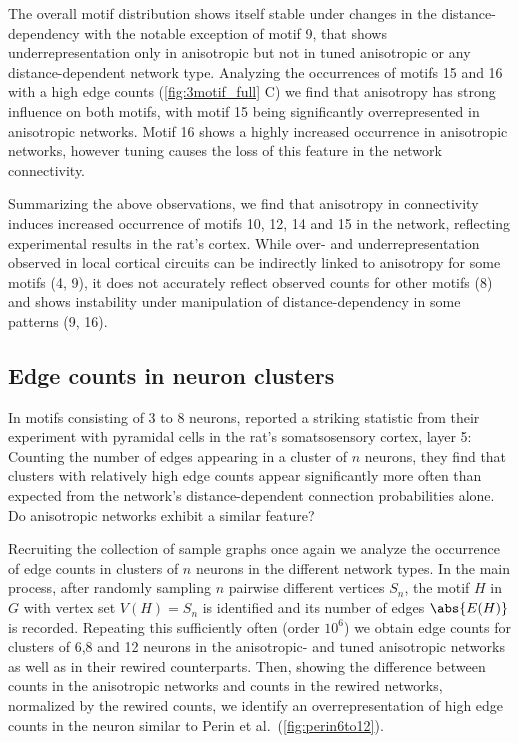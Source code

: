 The overall motif distribution shows itself stable under changes in
the distance-dependency with the notable exception of motif 9, that
shows underrepresentation only in anisotropic but not in tuned
anisotropic or any distance-dependent network type. Analyzing the
occurrences of motifs 15 and 16 with a high edge counts
(\autoref{fig:3motif_full} C) we find that anisotropy has strong
influence on both motifs, with motif 15 being significantly
overrepresented in anisotropic networks. Motif 16 shows a highly
increased occurrence in anisotropic networks, however tuning causes
the loss of this feature in the network connectivity.

Summarizing the above observations, we find that  anisotropy in connectivity induces increased occurrence of
motifs 10, 12, 14 and 15 in the network, reflecting experimental
results in the rat's cortex.  While over- and underrepresentation
observed in local cortical circuits can be indirectly linked to
anisotropy for some motifs (4, 9), it does not accurately reflect
observed counts for other motifs (8) and shows instability under
manipulation of distance-dependency in some patterns (9, 16).









\subsection*{Edge counts in neuron clusters}

In motifs consisting of 3 to 8 neurons, \textcite{Perin2011} reported
a striking statistic from their experiment with pyramidal cells in the
rat's somatsosensory cortex, layer 5: Counting the number of edges
appearing in a cluster of $n$ neurons, they find that clusters with
relatively high edge counts appear significantly more often than
expected from the network's distance-dependent connection
probabilities alone. Do anisotropic networks exhibit a similar
feature?

Recruiting the collection of sample graphs once again we analyze the
occurrence of edge counts in clusters of $n$ neurons in the different
network types. In the main process, after randomly sampling $n$
pairwise different vertices $S_n$, the motif $H$ in $G$ with vertex
set $V(H) = S_n$ is identified and its number of edges $\abs{E(H)}$ is
recorded. Repeating this sufficiently often (order $10^6$) we obtain
edge counts for clusters of 6,8 and 12 neurons in the anisotropic- and
tuned anisotropic networks as well as in their rewired
counterparts. Then, showing the difference between counts in the
anisotropic networks and counts in the rewired networks, normalized by the rewired
counts, we identify an overrepresentation of high edge counts in the
neuron similar to Perin et al.\ (\autoref{fig:perin6to12}).

